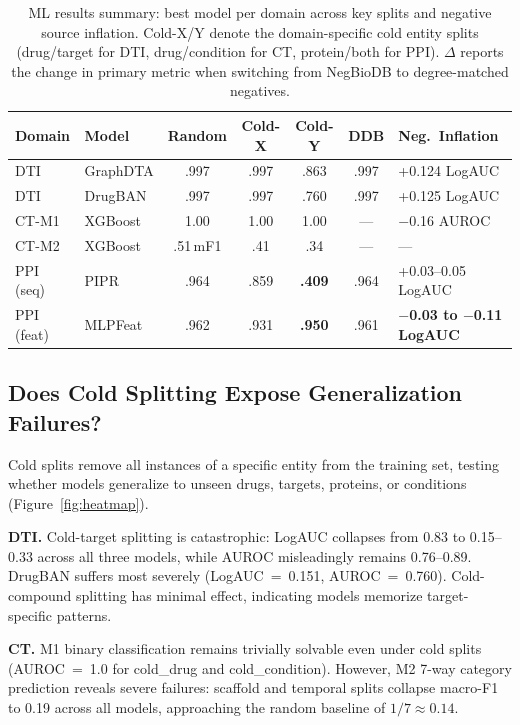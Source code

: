 \begin{table}[t]
\centering
\caption{ML results summary: best model per domain across key splits and negative source inflation. Cold-X/Y denote the domain-specific cold entity splits (drug/target for DTI, drug/condition for CT, protein/both for PPI). $\Delta$ reports the change in primary metric when switching from NegBioDB to degree-matched negatives.}
\label{tab:ml_results}
\small
\begin{tabular}{@{}llccccl@{}}
\toprule
\textbf{Domain} & \textbf{Model} & \textbf{Random} & \textbf{Cold-X} & \textbf{Cold-Y} & \textbf{DDB} & \textbf{Neg.\ Inflation} \\
\midrule
DTI & GraphDTA & .997 & .997 & .863 & .997 & +0.124 LogAUC \\
DTI & DrugBAN  & .997 & .997 & .760 & .997 & +0.125 LogAUC \\
\midrule
CT-M1 & XGBoost & 1.00 & 1.00 & 1.00 & --- & $-$0.16 AUROC \\
CT-M2 & XGBoost & .51{\scriptsize\,mF1} & .41 & .34 & --- & --- \\
\midrule
PPI\,(seq) & PIPR & .964 & .859 & \textbf{.409} & .964 & +0.03--0.05 LogAUC \\
PPI\,(feat) & MLPFeat & .962 & .931 & \textbf{.950} & .961 & \textbf{$-$0.03 to $-$0.11 LogAUC} \\
\bottomrule
\end{tabular}
\end{table}


\subsection{Does Cold Splitting Expose Generalization Failures?}
\label{sec:exp-cold}

Cold splits remove all instances of a specific entity from the training set, testing whether models generalize to unseen drugs, targets, proteins, or conditions (Figure~\ref{fig:heatmap}).

\textbf{DTI.} Cold-target splitting is catastrophic: LogAUC collapses from 0.83 to 0.15--0.33 across all three models, while AUROC misleadingly remains 0.76--0.89. DrugBAN suffers most severely (LogAUC~=~0.151, AUROC~=~0.760). Cold-compound splitting has minimal effect, indicating models memorize target-specific patterns.

\textbf{CT.} M1 binary classification remains trivially solvable even under cold splits (AUROC~=~1.0 for cold\_drug and cold\_condition). However, M2 7-way category prediction reveals severe failures: scaffold and temporal splits collapse macro-F1 to 0.19 across all models, approaching the random baseline of $1/7 \approx 0.14$.

